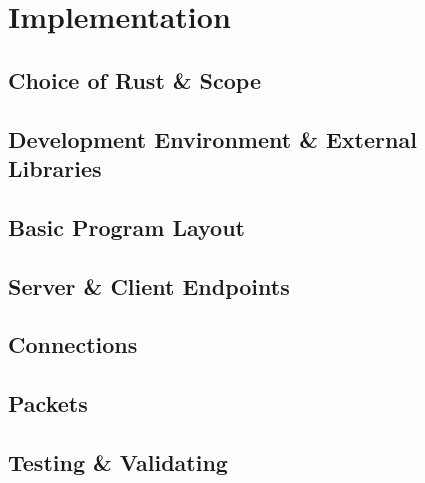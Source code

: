 \chapter{Implementation}

\section{Choice of Rust \& Scope}

\section{Development Environment \& External Libraries}

\section{Basic Program Layout}

\section{Server \& Client Endpoints}

\section{Connections}

\section{Packets}

\section{Testing \& Validating}
